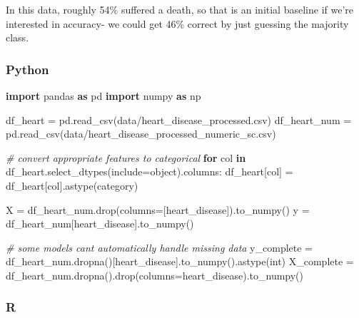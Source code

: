 \documentclass[
  letterpaper,
]{krantz}
\newenvironment{Shaded}{}{}
\newcommand{\BuiltInTok}[1]{\textcolor[rgb]{0.00,0.50,0.00}{#1}}
\newcommand{\CommentTok}[1]{\textcolor[rgb]{0.38,0.63,0.69}{\textit{#1}}}
\newcommand{\ControlFlowTok}[1]{\textcolor[rgb]{0.00,0.44,0.13}{\textbf{#1}}}
\newcommand{\ImportTok}[1]{\textcolor[rgb]{0.00,0.50,0.00}{\textbf{#1}}}
\newcommand{\KeywordTok}[1]{\textcolor[rgb]{0.00,0.44,0.13}{\textbf{#1}}}
\newcommand{\NormalTok}[1]{#1}
\newcommand{\OperatorTok}[1]{\textcolor[rgb]{0.40,0.40,0.40}{#1}}
\newcommand{\StringTok}[1]{\textcolor[rgb]{0.25,0.44,0.63}{#1}}
\begin{document}
In this data, roughly 54\% suffered a death, so that is an initial
baseline if we're interested in accuracy- we could get 46\% correct by
just guessing the majority class.

\subsubsection{Python}

\begin{Shaded}
\begin{Highlighting}[]
\ImportTok{import}\NormalTok{ pandas }\ImportTok{as}\NormalTok{ pd}
\ImportTok{import}\NormalTok{ numpy }\ImportTok{as}\NormalTok{ np}

\NormalTok{df\_heart }\OperatorTok{=}\NormalTok{ pd.read\_csv(}\StringTok{\textquotesingle{}data/heart\_disease\_processed.csv\textquotesingle{}}\NormalTok{)}
\NormalTok{df\_heart\_num }\OperatorTok{=}\NormalTok{ pd.read\_csv(}\StringTok{\textquotesingle{}data/heart\_disease\_processed\_numeric\_sc.csv\textquotesingle{}}\NormalTok{)}

\CommentTok{\# convert appropriate features to categorical}
\ControlFlowTok{for}\NormalTok{ col }\KeywordTok{in}\NormalTok{ df\_heart.select\_dtypes(include}\OperatorTok{=}\StringTok{\textquotesingle{}object\textquotesingle{}}\NormalTok{).columns:}
\NormalTok{    df\_heart[col] }\OperatorTok{=}\NormalTok{ df\_heart[col].astype(}\StringTok{\textquotesingle{}category\textquotesingle{}}\NormalTok{)}

\NormalTok{X }\OperatorTok{=}\NormalTok{ df\_heart\_num.drop(columns}\OperatorTok{=}\NormalTok{[}\StringTok{\textquotesingle{}heart\_disease\textquotesingle{}}\NormalTok{]).to\_numpy()}
\NormalTok{y }\OperatorTok{=}\NormalTok{ df\_heart\_num[}\StringTok{\textquotesingle{}heart\_disease\textquotesingle{}}\NormalTok{].to\_numpy()}

\CommentTok{\# some models can\textquotesingle{}t automatically handle missing data}
\NormalTok{y\_complete }\OperatorTok{=}\NormalTok{ df\_heart\_num.dropna()[}\StringTok{\textquotesingle{}heart\_disease\textquotesingle{}}\NormalTok{].to\_numpy().astype(}\BuiltInTok{int}\NormalTok{)}
\NormalTok{X\_complete }\OperatorTok{=}\NormalTok{ df\_heart\_num.dropna().drop(columns}\OperatorTok{=}\StringTok{\textquotesingle{}heart\_disease\textquotesingle{}}\NormalTok{).to\_numpy()}
\end{Highlighting}
\end{Shaded}

\subsubsection{R}
\end{document}
